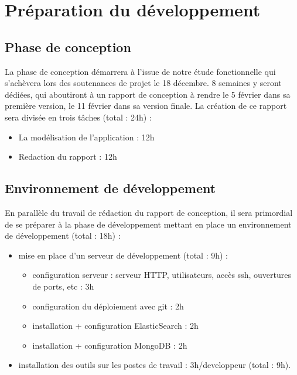 \section{Préparation du développement}

    \subsection{Phase de conception}
        La phase de conception démarrera à l'issue de notre étude fonctionnelle qui s'achèvera lors des soutenances de projet le 18 décembre.  8 semaines y seront dédiées, qui aboutiront à un rapport de conception à rendre le 5 février dans sa première version, le 11 février dans sa version finale. La création de ce rapport sera divisée en trois tâches (total : 24h) :
        \begin{itemize}
            \item La modélisation de l'application : 12h
            \item Redaction du rapport : 12h
        \end{itemize}

    \subsection{Environnement de développement}
        En parallèle du travail de rédaction du rapport de conception, il sera primordial de se préparer à la phase de développement mettant en place un environnement de développement (total : 18h) :
        \begin{itemize}
            \item mise en place d'un serveur de développement (total : 9h) :
            \begin{itemize}
                \item configuration serveur : serveur HTTP, utilisateurs, accès ssh, ouvertures de ports, etc : 3h
                \item configuration du déploiement avec git : 2h
                \item installation + configuration ElasticSearch : 2h
                \item installation + configuration MongoDB : 2h
            \end{itemize}
            \item installation des outils sur les postes de travail : 3h/developpeur (total : 9h).
        \end{itemize}

